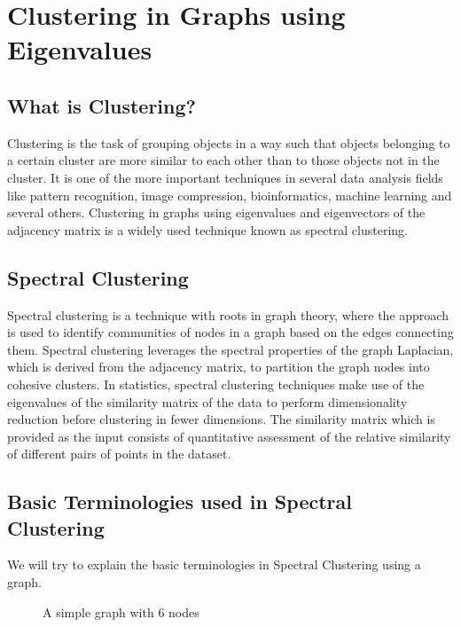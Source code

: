\documentclass{article}
\begin{document}
\section{Clustering in Graphs using Eigenvalues}

    \subsection{What is Clustering?}
    Clustering is the task of grouping objects in a way such that objects belonging to a certain cluster are more similar to each other than to those objects not in the cluster. It is one of the more important techniques in several data analysis fields like pattern recognition, image compression,  bioinformatics, machine learning and several others. Clustering in graphs using eigenvalues and eigenvectors of the adjacency matrix is a widely used technique known as spectral clustering.
    
    \subsection{Spectral Clustering}
    Spectral clustering is a technique with roots in graph theory, where the approach is used to identify communities of nodes in a graph based on the edges connecting them.
    Spectral clustering leverages the spectral properties of the graph Laplacian, which is derived from the adjacency matrix, to partition the graph nodes into cohesive clusters.
    In statistics, spectral clustering techniques make use of the eigenvalues of the similarity matrix of the data to perform dimensionality reduction before clustering in fewer dimensions. The similarity matrix which is provided as the input consists of quantitative assessment of the relative similarity of different pairs of points in the dataset.
    
    \subsection{Basic Terminologies used in Spectral Clustering}
    We will try to explain the basic terminologies in Spectral Clustering using a graph.
        \begin{figure}[ht]
        \centering
            \caption{A simple graph with 6 nodes}
            \label{fig:graph}
        \end{figure}
\end{document}
